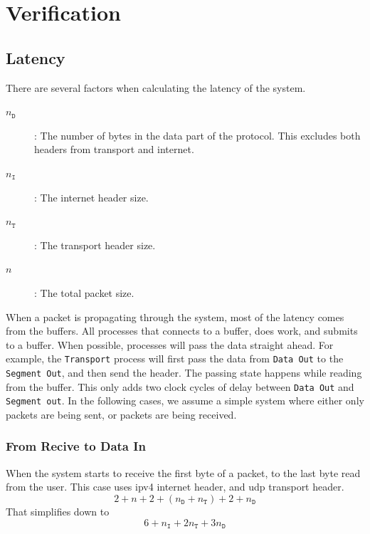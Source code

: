 \section{Verification}
\subsection{Latency}\label{subsec:latency}
There are several factors when calculating the latency of the system.
\begin{description}
    \item[$n_{\mathtt{D}}$]:\quad
    The number of bytes in the data part of the protocol. This excludes both
    headers from transport and internet.
    \item[$n_{\mathtt{I}}$]:\quad
    The internet header size.
    \item[$n_{\mathtt{T}}$]:\quad
    The transport header size.
    \item[$n$]:\quad
    The total packet size.
\end{description}
When a packet is propagating through the system, most
of the latency comes from the buffers. All processes that connects
to a buffer, does work, and submits to a buffer.
When possible, processes will pass the data straight ahead. For example, the
\texttt{Transport} process will first pass the data from \texttt{Data Out} to
the \texttt{Segment Out}, and then send the header. The passing state happens
while reading from the buffer. This only adds two clock cycles of delay between
\texttt{Data Out} and \texttt{Segment out}.
In the following cases, we assume a simple system where either only packets are
being sent, or packets are being received.

\subsubsection{From Recive to Data In}
When the system starts to receive the first byte of a packet, to the last byte read from
the user. This case uses \gls{ipv4} internet header, and \gls{udp} transport
header.
\begin{equation*}
    2 + n + 2 + (n_{\mathtt{D}} + n_{\mathtt{T}}) + 2 + n_{\mathtt{D}}
\end{equation*}
That simplifies down to
\begin{equation} \label{eq:receive_to_datain}
     6 + n_{\mathtt{I}} + 2n_{\mathtt{T}} + 3n_{\mathtt{D}}
\end{equation}
